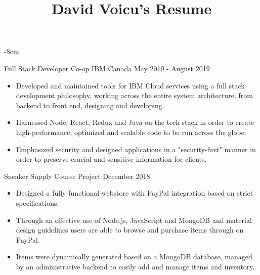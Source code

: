 \documentclass[10pt,a4paper]{altacv}
\begin{document}
\title{David Voicu's Resume}

\begin{adjustwidth}{}{-8cm}
\makecvheader
\end{adjustwidth}


\cvproject
	{Full Stack Developer Co-op}
    {IBM Canada}
    {May 2019 - August 2019}
\begin{itemize}
	\item {Developed and maintained tools for IBM Cloud services using a full stack development philosophy, working across the entire system architecture, from backend to front end, designing and developing.}
	\item {Harnessed Node, React, Redux and Java on the tech stack in order to create high-performance, optimized and scalable code to be run across the globe.}
	\item {Emphasized security and designed applications in a "security-first" manner in order to preserve crucial and sensitive information for clients.}
\end{itemize}


\cvproject
	{Sneaker Supply}
    {Course Project}
    {December 2018}
\begin{itemize}
	\item {Designed a fully functional webstore with PayPal integration based on strict specifications.}
	\item {Through an effective use of Node.js, JavaScript and MongoDB and material design guidelines users are able to browse and purchase items through on PayPal.}
	\item {Items were dynamically generated based on a MongoDB database, managed by an administrative backend to easily add and manage items and inventory.}
\end{itemize}
\end{document}
